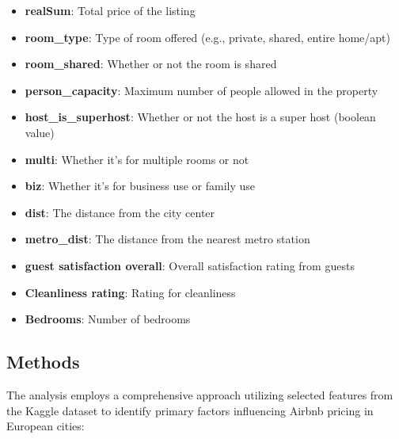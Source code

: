 \documentclass[12pt, letterpaper]{article}
\begin{document}
\begin{itemize}
  \item \textbf{realSum}: Total price of the listing
  \item \textbf{room\_type}: Type of room offered (e.g., private, shared, entire home/apt)
  \item \textbf{room\_shared}: Whether or not the room is shared
  \item \textbf{person\_capacity}: Maximum number of people allowed in the property
  \item \textbf{host\_is\_superhost}: Whether or not the host is a super host (boolean value)
  \item \textbf{multi}: Whether it's for multiple rooms or not
  \item \textbf{biz}: Whether it's for business use or family use
  \item \textbf{dist}: The distance from the city center
  \item \textbf{metro\_dist}: The distance from the nearest metro station
  \item \textbf{guest satisfaction overall}: Overall satisfaction rating from guests
  \item \textbf{Cleanliness rating}: Rating for cleanliness
  \item \textbf{Bedrooms}: Number of bedrooms
\end{itemize}

\subsection*{Methods}

The analysis employs a comprehensive approach utilizing selected features from the Kaggle dataset to identify primary factors influencing Airbnb pricing in European cities:
\end{document}
